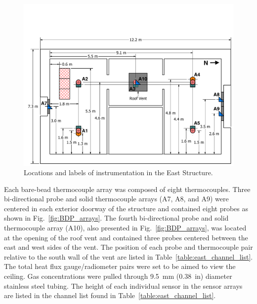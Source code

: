 \documentclass[12pt,oneside]{book}
\begin{document}
\begin{figure}[!ht]
	\includegraphics[width=\columnwidth]{../Figures/Floor_Plans/East_Structure_Dimensioned_Instrumentation}
	\caption{Locations and labels of instrumentation in the East Structure.}
	\label{fig:east_instrumentation}
\end{figure}
\FloatBarrier

Each bare-bead thermocouple array was composed of eight thermocouples. Three bi-directional probe and solid thermocouple arrays (A7, A8, and A9) were centered in each exterior doorway of the structure and contained eight probes as shown in Fig.~\ref{fig:BDP_arrays}. The fourth bi-directional probe and solid thermocouple array (A10), also presented in Fig.~\ref{fig:BDP_arrays}, was located at the opening of the roof vent and contained three probes centered between the east and west sides of the vent. The position of each probe and thermocouple pair relative to the south wall of the vent are listed in Table~\ref{table:east_channel_list}. The total heat flux gauge/radiometer pairs were set to be aimed to view the ceiling. Gas concentrations were pulled through 9.5~mm (0.38~in) diameter stainless steel tubing. The height of each individual sensor in the sensor arrays are listed in the channel list found in Table~\ref{table:east_channel_list}.   
\end{document}
